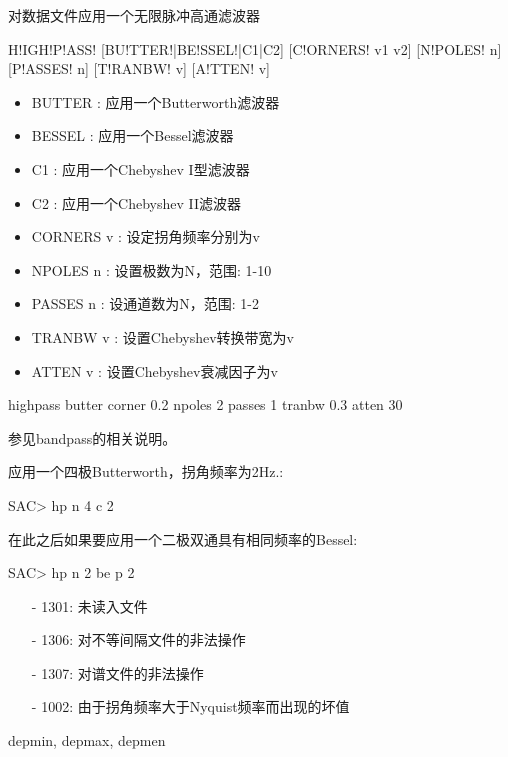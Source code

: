 \label{cmd:highpass}

对数据文件应用一个无限脉冲高通滤波器

\begin{SACSTX}
H!IGH!P!ASS! [BU!TTER!|BE!SSEL!|C1|C2] [C!ORNERS! v1 v2] [N!POLES! n] [P!ASSES! n] 
    [T!RANBW! v] [A!TTEN! v]
\end{SACSTX}

\begin{itemize}
\item BUTTER : 应用一个Butterworth滤波器 
\item BESSEL : 应用一个Bessel滤波器  
\item C1 : 应用一个Chebyshev I型滤波器 
\item C2 : 应用一个Chebyshev II滤波器 
\item CORNERS v  : 设定拐角频率分别为v  
\item NPOLES n : 设置极数为N，范围: 1-10
\item PASSES n : 设通道数为N，范围: 1-2
\item TRANBW v : 设置Chebyshev转换带宽为v 
\item ATTEN v : 设置Chebyshev衰减因子为v
\end{itemize}

\begin{SACDFT}
highpass butter corner 0.2 npoles 2 passes 1 tranbw 0.3 atten 30
\end{SACDFT}

参见bandpass的相关说明。

应用一个四极Butterworth，拐角频率为2Hz.:
\begin{SACCode}
SAC> hp n 4 c 2
\end{SACCode}

在此之后如果要应用一个二极双通具有相同频率的Bessel:
\begin{SACCode}
SAC> hp n 2 be p 2
\end{SACCode}

\begin{itemize}
\item[-]1301: 未读入文件
\item[-]1306: 对不等间隔文件的非法操作
\item[-]1307: 对谱文件的非法操作
\item[-]1002: 由于拐角频率大于Nyquist频率而出现的坏值
\end{itemize}

depmin, depmax, depmen

